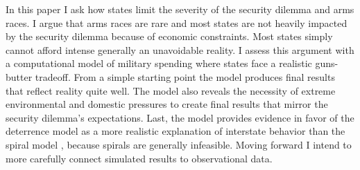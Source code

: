 \documentclass[12pt]{article}
\begin{document}
In this paper I ask how states limit the severity of the security dilemma and arms races. I argue that arms races are rare and most states are not heavily impacted by the security dilemma because of economic constraints. Most states simply cannot afford intense generally an unavoidable reality. I assess this argument with a computational model of military spending where states face a realistic guns-butter tradeoff. From a simple starting point the model produces final results that reflect reality quite well. The model also reveals the necessity of extreme environmental and domestic pressures to create final results that mirror the security dilemma's expectations. Last, the model provides evidence in favor of the deterrence model as a more realistic explanation of interstate behavior than the spiral model \citep{braumoeller2008}, because spirals are generally infeasible.  Moving forward I intend to more carefully connect simulated results to observational data.



\newpage
\singlespacing



\end{document}
